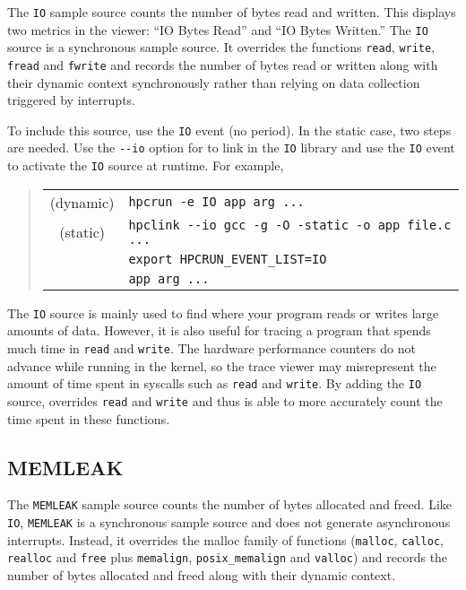 The \verb|IO| sample source counts the number of bytes read and
written.  This displays two metrics in the viewer: ``IO Bytes Read''
and ``IO Bytes Written.''  The \verb|IO| source is a synchronous sample
source.  
It overrides the functions \verb|read|, \verb|write|, \verb|fread|
and \verb|fwrite| and records the number of bytes read or
written along with their dynamic context synchronously rather 
than relying on data collection triggered by interrupts.

To include this source, use the \verb|IO| event (no period).  In the
static case, two steps are needed.  Use the \verb|--io| option for
\hpclink{} to link in the \verb|IO| library and use the \verb|IO| event
to activate the \verb|IO| source at runtime.  For example,

\begin{quote}
\begin{tabular}{@{}cl}
(dynamic) & \verb|hpcrun -e IO app arg ...| \\
(static)  & \verb|hpclink --io gcc -g -O -static -o app file.c ...| \\
& \verb|export HPCRUN_EVENT_LIST=IO| \\
& \verb|app arg ...|
\end{tabular}
\end{quote}

The \verb|IO| source is mainly used to find where your program reads or
writes large amounts of data.  However, it is also useful for tracing
a program that spends much time in \verb|read| and \verb|write|.  The
hardware performance counters do not advance while running in
the kernel, so the trace viewer may misrepresent the amount of time
spent in syscalls such as \verb|read| and \verb|write|.  By adding the
\verb|IO| source, \hpcrun{} overrides \verb|read| and \verb|write| and
thus is able to more accurately count the time spent in these
functions.

\subsection{MEMLEAK}

The \verb|MEMLEAK| sample source counts the number of bytes allocated
and freed.  Like \verb|IO|, \verb|MEMLEAK| is a synchronous sample
source and does not generate asynchronous interrupts.  Instead, it
overrides the malloc family of functions (\verb|malloc|, \verb|calloc|,
\verb|realloc| and \verb|free| plus \verb|memalign|, \verb|posix_memalign|
and \verb|valloc|) and records the number of bytes
allocated and freed along with their dynamic context.

